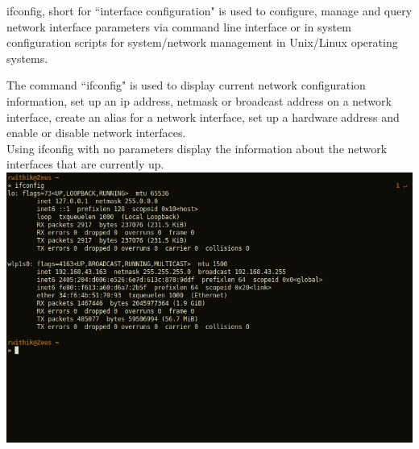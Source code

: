 \documentclass[10pt,a4paper]{report}
\begin{document}
\begin{flushleft}
ifconfig, short for ``interface configuration" is used to configure, manage and query network interface parameters via command line interface or in system configuration scripts for system/network management in Unix/Linux operating systems. \par
The command ``ifconfig" is used to display current network configuration information, set up an ip address, netmask or broadcast address on a network interface, create an alias for a network interface, set up a hardware address and enable or disable network interfaces.\\
\medskip
Using {\color{red} ifconfig} with no parameters display the information about the network interfaces that are currently up.\\
\medskip
\includegraphics[scale=.5]{../Images/Network/1.png}


\end{flushleft}
\end{document}
